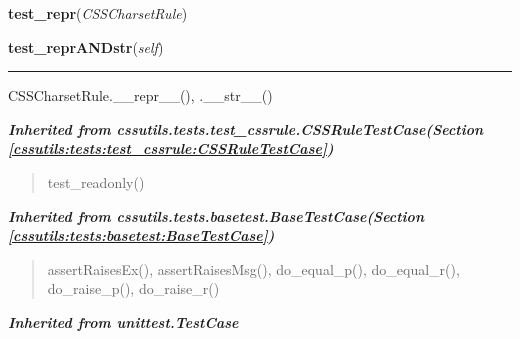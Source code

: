     \vspace{0.5ex}

\hspace{.8\funcindent}\begin{boxedminipage}{\funcwidth}

    \raggedright \textbf{test\_repr}(\textit{CSSCharsetRule})

\setlength{\parskip}{2ex}
\setlength{\parskip}{1ex}
    \end{boxedminipage}

    \label{cssutils:tests:test_csscharsetrule:CSSCharsetRuleTestCase:test_reprANDstr}

    \vspace{0.5ex}

\hspace{.8\funcindent}\begin{boxedminipage}{\funcwidth}

    \raggedright \textbf{test\_reprANDstr}(\textit{self})

    \vspace{-1.5ex}

    \rule{\textwidth}{0.5\fboxrule}
\setlength{\parskip}{2ex}
    CSSCharsetRule.\_\_repr\_\_(), .\_\_str\_\_()

\setlength{\parskip}{1ex}
    \end{boxedminipage}


\large{\textbf{\textit{Inherited from cssutils.tests.test\_cssrule.CSSRuleTestCase\textit{(Section \ref{cssutils:tests:test_cssrule:CSSRuleTestCase})}}}}

\begin{quote}
test\_readonly()
\end{quote}

\large{\textbf{\textit{Inherited from cssutils.tests.basetest.BaseTestCase\textit{(Section \ref{cssutils:tests:basetest:BaseTestCase})}}}}

\begin{quote}
assertRaisesEx(), assertRaisesMsg(), do\_equal\_p(), do\_equal\_r(), do\_raise\_p(), do\_raise\_r()
\end{quote}

\large{\textbf{\textit{Inherited from unittest.TestCase}}}

